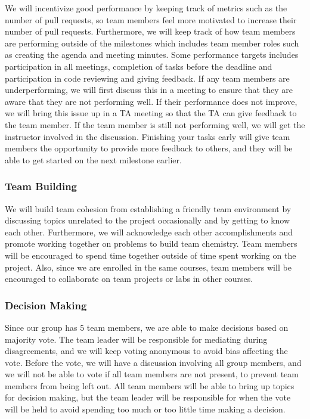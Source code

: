 \documentclass{article}
\begin{document}
We will incentivize good performance by keeping track of metrics such as the number of pull requests, so team members feel more motivated to increase their number of pull requests. Furthermore, we will 
keep track of how team members are performing outside of the milestones which includes team member roles such as creating the agenda and meeting minutes. Some performance targets includes participation 
in all meetings, completion of tasks before the deadline and participation in code reviewing and giving feedback. If any team members are underperforming, we will first discuss this in a meeting to 
ensure that they are aware that they are not performing well. If their performance does not improve, we will bring this issue up in a TA meeting so that the TA can give feedback to the team member. 
If the team member is still not performing well, we will get the instructor involved in the discussion. Finishing your tasks early will give team members the opportunity to provide more feedback to 
others, and they will be able to get started on the next milestone earlier.

\subsubsection*{Team Building}

We will build team cohesion from establishing a friendly team environment by discussing topics unrelated to the project occasionally and by getting to know each other. Furthermore, we will acknowledge 
each other accomplishments and promote working together on problems to build team chemistry. Team members will be encouraged to spend time together outside of time spent working on the project. Also, since we 
are enrolled in the same courses, team members will be encouraged to collaborate on team projects or labs in other courses. 

\subsubsection*{Decision Making} 

Since our group has 5 team members, we are able to make decisions based on majority vote. The team leader will be responsible for mediating during disagreements, and we will keep voting anonymous to avoid bias 
affecting the vote. Before the vote, we will have a discussion involving all group members, and we will not be able to vote if all team members are not present, to prevent team members from being left out. 
All team members will be able to bring up topics for decision making, but the team leader will be responsible for when the vote will be held to avoid spending too much or too little time making a decision.
\end{document}
